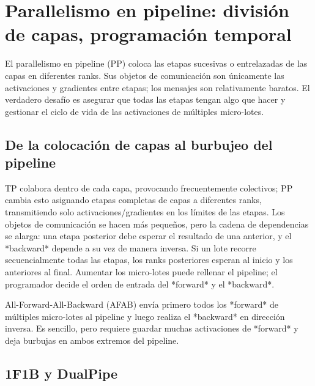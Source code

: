 \section{Parallelismo en pipeline: división de capas, programación temporal}

El parallelismo en pipeline (PP) coloca las etapas sucesivas o entrelazadas de las capas en diferentes ranks. Sus objetos de comunicación son únicamente las activaciones y gradientes entre etapas; los mensajes son relativamente baratos. El verdadero desafío es asegurar que todas las etapas tengan algo que hacer y gestionar el ciclo de vida de las activaciones de múltiples micro-lotes.

\subsection{De la colocación de capas al burbujeo del pipeline}

TP colabora dentro de cada capa, provocando frecuentemente colectivos; PP cambia esto asignando etapas completas de capas a diferentes ranks, transmitiendo solo activaciones/gradientes en los límites de las etapas. Los objetos de comunicación se hacen más pequeños, pero la cadena de dependencias se alarga: una etapa posterior debe esperar el resultado de una anterior, y el *backward* depende a su vez de manera inversa. Si un lote recorre secuencialmente todas las etapas, los ranks posteriores esperan al inicio y los anteriores al final. Aumentar los micro-lotes puede rellenar el pipeline; el programador decide el orden de entrada del *forward* y el *backward*.


All-Forward-All-Backward (AFAB) envía primero todos los *forward* de múltiples micro-lotes al pipeline y luego realiza el *backward* en dirección inversa. Es sencillo, pero requiere guardar muchas activaciones de *forward* y deja burbujas en ambos extremos del pipeline.



\subsection{1F1B y DualPipe}

